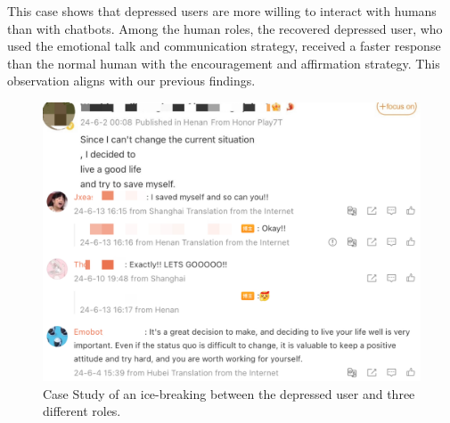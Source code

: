 This case shows that depressed users are more willing to interact with humans than with chatbots. Among the human roles, the recovered depressed user, who used the emotional talk and communication strategy, received a faster response than the normal human with the encouragement and affirmation strategy. This observation aligns with our previous findings.

\begin{figure}[th]
    \centering
    \includegraphics[width=1\columnwidth]{images/case.jpeg}
    \caption{Case Study of an ice-breaking between the depressed user and three different roles.}
    \label{fig:case1}
\end{figure}

